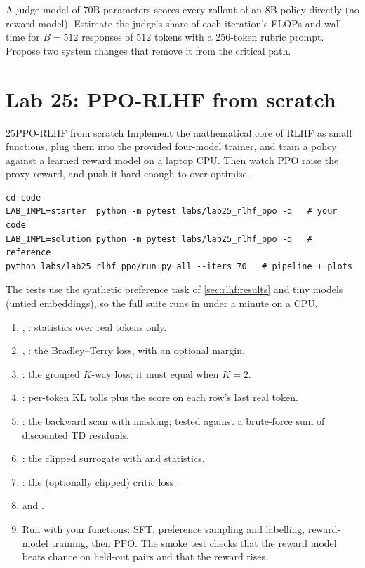 \begin{exercise}
A judge model of 70B parameters scores every rollout of an 8B policy directly (no reward model).
Estimate the judge's share of each iteration's FLOPs and wall time for $B=512$ responses of 512 tokens with a
256-token rubric prompt. Propose two system changes that remove it from the critical path.
\end{exercise}

\section{Lab 25: PPO-RLHF from scratch}\label{sec:rlhf:lab}

\begin{labbox}{25}{PPO-RLHF from scratch}
Implement the mathematical core of RLHF as small functions, plug them into the provided four-model trainer,
and train a policy against a learned reward model on a laptop CPU. Then watch PPO raise the proxy
reward, and push it hard enough to over-optimise.

\begin{lstlisting}[style=shell]
cd code
LAB_IMPL=starter  python -m pytest labs/lab25_rlhf_ppo -q   # your code
LAB_IMPL=solution python -m pytest labs/lab25_rlhf_ppo -q   # reference
python labs/lab25_rlhf_ppo/run.py all --iters 70   # pipeline + plots
\end{lstlisting}
The tests use the synthetic preference task of \cref{sec:rlhf:results} and tiny models (untied
embeddings), so the full suite runs in under a minute on a CPU.

\begin{enumerate}
  \item {}, : statistics over real tokens only.
  \item {}, : the Bradley--Terry loss, with an optional margin.
  \item {}: the grouped $K$-way loss; it must equal  when $K=2$.
  \item {}: per-token KL tolls plus the score on each row's last real token.
  \item {}: the backward scan with masking; tested against a brute-force sum of discounted TD residuals.
  \item {}: the clipped surrogate with  and  statistics.
  \item {}: the (optionally clipped) critic loss.
  \item {} and .
  \item Run  with your functions: SFT, preference sampling and labelling, reward-model
        training, then PPO. The smoke test checks that the reward model beats chance on held-out pairs and
        that the reward rises.
\end{enumerate}


\end{labbox}
